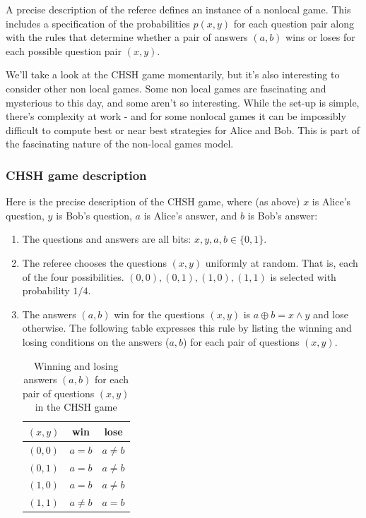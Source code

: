 A precise description of the referee defines an instance of a nonlocal game. This includes a specification of the probabilities $p(x,y)$ for each question pair along with the rules that determine whether a pair of answers $(a,b)$ wins or loses for each possible question pair $(x,y)$.

We'll take a look at the CHSH game momentarily, but it's also interesting to consider other non local games. Some non local games are fascinating and mysterious to this day, and some aren't so interesting. While the set-up is simple, there's complexity at work - and for some nonlocal games it can be impossibly difficult to compute best or near best strategies for Alice and Bob. This is part of the fascinating nature of the non-local games model.

\subsubsection{CHSH game description}
Here is the precise description of the CHSH game, where (as above) $x$ is Alice's question, $y$ is Bob's question, $a$ is Alice's answer, and $b$ is Bob's answer:
\begin{enumerate}
    \item The questions and answers are all bits: $x,y,a,b \in \{0,1\}$.
    \item The referee chooses the questions $(x,y)$ uniformly at random. That is, each of the four possibilities. $(0,0),(0,1),(1,0),(1,1)$ is selected with probability $1/4$.
    \item The answers $(a,b)$ win for the questions $(x,y)$ is $a \oplus b= x \land y$ and lose otherwise. The following table expresses this rule by listing the winning and losing conditions on the answers ($a,b$) for each pair of questions $(x,y)$.
    
    \begin{table}[ht]
        \centering
        \begin{tabular}{|c|c|c|}
        \hline
             $(x,y)$ & win  & lose \\
             \hline
             $(0,0)$ & $a=b$ & $a \neq b$\\
             \hline
             $(0,1)$ & $a=b$ & $a \neq b$\\
             \hline
             $(1,0)$ & $a=b$  & $a \neq b$\\
             \hline
             $(1,1)$ & $a\neq b$ & $a=b$ \\
             \hline
        \end{tabular}
        \caption{Winning and losing answers $(a,b)$ for each pair of questions $(x,y)$ in the CHSH game}
        \label{tab:chsh_win_lose}
    \end{table}
\end{enumerate}

